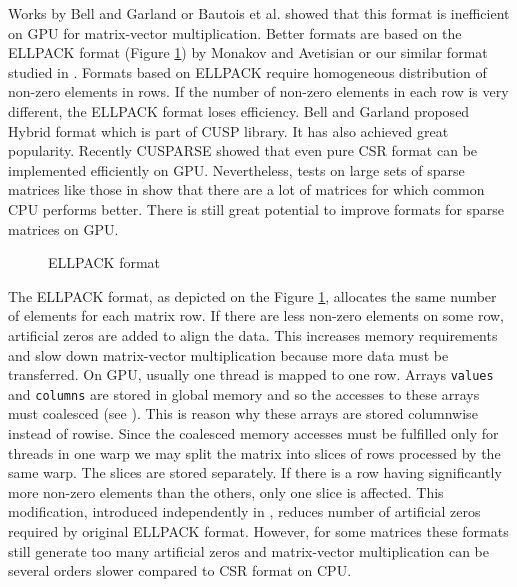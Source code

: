 \documentclass{pj}
\begin{document}
Works by Bell and Garland \cite{BellGarland-2008} or Bautois et al. \cite{BuatoisCaumonLevy-2009} showed that this format is inefficient on GPU for matrix-vector multiplication. Better formats are based on the ELLPACK format (Figure \ref{fig:ellpack}) by Monakov and Avetisian \cite{MonakovLokhmotovAvetisyan-2010} or our similar format studied in \cite{OberhuberSuzukiVacata-2011}. Formats based on ELLPACK require homogeneous distribution of non-zero elements in rows. If the number of non-zero elements in each row is very different, the ELLPACK format loses efficiency. Bell and Garland \cite{BellGarland-2008} proposed Hybrid format which is part of CUSP library. It has also achieved great popularity. Recently CUSPARSE \cite{Nvidia-2012} showed that even pure CSR format can be implemented efficiently on GPU. Nevertheless, tests on large sets of sparse matrices like those in \cite{OberhuberSuzukiVacata-2011} show that there are a lot of matrices for which common CPU performs better. There is still great potential to improve formats for sparse matrices on GPU.
\begin{figure}[]
\caption{ELLPACK format}
\label{fig:ellpack}
\end{figure}
The ELLPACK format, as depicted on the Figure \ref{fig:ellpack}, allocates the same number of elements for each matrix row. If there are less non-zero elements on some row, artificial zeros are added to align the data. This increases memory requirements and slow down matrix-vector multiplication because more data must be transferred. On GPU, usually one thread is mapped to one row. Arrays {\tt values} and {\tt columns} are stored in global memory and so the accesses to these arrays must coalesced (see \cite{BellGarland-2008,OberhuberSuzukiVacata-2011}). This is reason why these arrays are stored columnwise instead of rowise. Since the coalesced memory accesses must be fulfilled only for threads in one warp we may split the matrix into slices of rows processed by the same warp. The slices are stored separately. If there is a row having significantly more non-zero elements than the others, only one slice is affected. This modification, introduced independently in \cite{MonakovLokhmotovAvetisyan-2010,OberhuberSuzukiVacata-2011}, reduces number of artificial zeros required by original ELLPACK format. However, for some matrices these formats still generate too many artificial zeros and matrix-vector multiplication can be several orders slower compared to CSR format on CPU.
\end{document}
